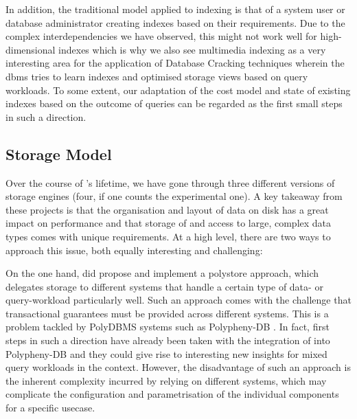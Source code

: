 In addition, the traditional model applied to indexing is that of a system user or database administrator creating indexes based on their requirements. Due to the complex interdependencies we have observed, this might not work well for high-dimensional indexes which is why we also see multimedia indexing as a very interesting area for the application of Database Cracking techniques \cite{Idreos:2007Database,Schuhknecht:2013Uncracked} wherein the \acrshort{dbms} tries to learn indexes and optimised storage views based on query workloads. To some extent, our adaptation of the cost model and state of existing indexes based on the outcome of queries can be regarded as the first small steps in such a direction.

\subsection{Storage Model}
Over the course of \cottontail{}'s lifetime, we have gone through three different versions of storage engines (four, if one counts the experimental one). A key takeaway from these projects is that the organisation and layout of data on disk has a great impact on performance and that storage of and access to large, complex data types comes with unique requirements. At a high level, there are two ways to approach this issue, both equally interesting and challenging:

On the one hand, \cite{Giangreco:2018Database} did propose and implement a polystore approach, which delegates storage to different systems that handle a certain type of data- or query-workload particularly well. Such an approach comes with the challenge that transactional guarantees must be provided across different systems. This is a problem tackled by PolyDBMS \cite{Vogt:2021Polystore} systems such as Polypheny-DB \cite{Vogt:2018Polypheny,Vogt:2020Polypheny}. In fact, first steps in such a direction have already been taken with the integration of \cottontail{} into Polypheny-DB and they could give rise to interesting new insights for mixed query workloads in the \vitrivr{} context. However, the disadvantage of such an approach is the inherent complexity incurred by relying on different systems, which may complicate the configuration and parametrisation of the individual components for a specific usecase.


